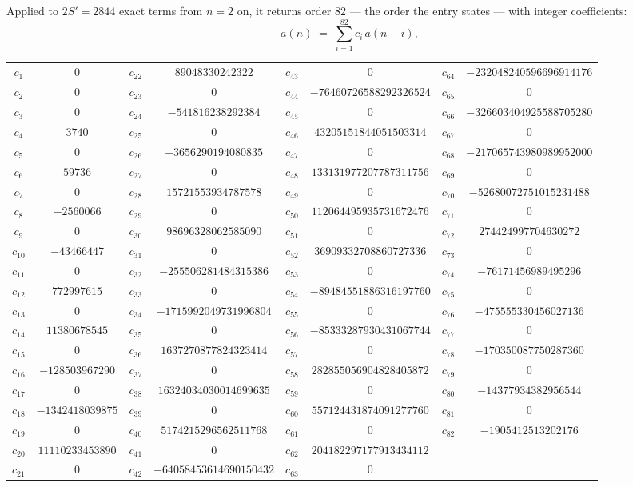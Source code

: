 \documentclass[11pt,a4paper]{article}
\theoremstyle{plain}
\theoremstyle{definition}
\begin{document}
Applied to $2S'=2844$ exact terms from $n=2$ on, it returns order $82$ --- the
order the entry states --- with integer coefficients:
\[
a(n)\;=\;\sum_{i=1}^{82}c_i\,a(n-i),
\]
\begin{center}\small
\begin{tabular}{cccccccc}
$c_{1}$ & $0$ & $c_{22}$ & $89048330242322$ & $c_{43}$ & $0$ & $c_{64}$ & $-232048240596696914176$ \\
$c_{2}$ & $0$ & $c_{23}$ & $0$ & $c_{44}$ & $-76460726588292326524$ & $c_{65}$ & $0$ \\
$c_{3}$ & $0$ & $c_{24}$ & $-541816238292384$ & $c_{45}$ & $0$ & $c_{66}$ & $-326603404925588705280$ \\
$c_{4}$ & $3740$ & $c_{25}$ & $0$ & $c_{46}$ & $43205151844051503314$ & $c_{67}$ & $0$ \\
$c_{5}$ & $0$ & $c_{26}$ & $-3656290194080835$ & $c_{47}$ & $0$ & $c_{68}$ & $-217065743980989952000$ \\
$c_{6}$ & $59736$ & $c_{27}$ & $0$ & $c_{48}$ & $133131977207787311756$ & $c_{69}$ & $0$ \\
$c_{7}$ & $0$ & $c_{28}$ & $15721553934787578$ & $c_{49}$ & $0$ & $c_{70}$ & $-52680072751015231488$ \\
$c_{8}$ & $-2560066$ & $c_{29}$ & $0$ & $c_{50}$ & $112064495935731672476$ & $c_{71}$ & $0$ \\
$c_{9}$ & $0$ & $c_{30}$ & $98696328062585090$ & $c_{51}$ & $0$ & $c_{72}$ & $274424997704630272$ \\
$c_{10}$ & $-43466447$ & $c_{31}$ & $0$ & $c_{52}$ & $36909332708860727336$ & $c_{73}$ & $0$ \\
$c_{11}$ & $0$ & $c_{32}$ & $-255506281484315386$ & $c_{53}$ & $0$ & $c_{74}$ & $-76171456989495296$ \\
$c_{12}$ & $772997615$ & $c_{33}$ & $0$ & $c_{54}$ & $-89484551886316197760$ & $c_{75}$ & $0$ \\
$c_{13}$ & $0$ & $c_{34}$ & $-1715992049731996804$ & $c_{55}$ & $0$ & $c_{76}$ & $-475555330456027136$ \\
$c_{14}$ & $11380678545$ & $c_{35}$ & $0$ & $c_{56}$ & $-85333287930431067744$ & $c_{77}$ & $0$ \\
$c_{15}$ & $0$ & $c_{36}$ & $1637270877824323414$ & $c_{57}$ & $0$ & $c_{78}$ & $-170350087750287360$ \\
$c_{16}$ & $-128503967290$ & $c_{37}$ & $0$ & $c_{58}$ & $282855056904828405872$ & $c_{79}$ & $0$ \\
$c_{17}$ & $0$ & $c_{38}$ & $16324034030014699635$ & $c_{59}$ & $0$ & $c_{80}$ & $-14377934382956544$ \\
$c_{18}$ & $-1342418039875$ & $c_{39}$ & $0$ & $c_{60}$ & $557124431874091277760$ & $c_{81}$ & $0$ \\
$c_{19}$ & $0$ & $c_{40}$ & $5174215296562511768$ & $c_{61}$ & $0$ & $c_{82}$ & $-1905412513202176$ \\
$c_{20}$ & $11110233453890$ & $c_{41}$ & $0$ & $c_{62}$ & $204182297177913434112$ &  &  \\
$c_{21}$ & $0$ & $c_{42}$ & $-64058453614690150432$ & $c_{63}$ & $0$ &  &  \\
\end{tabular}
\end{center}
\end{document}
